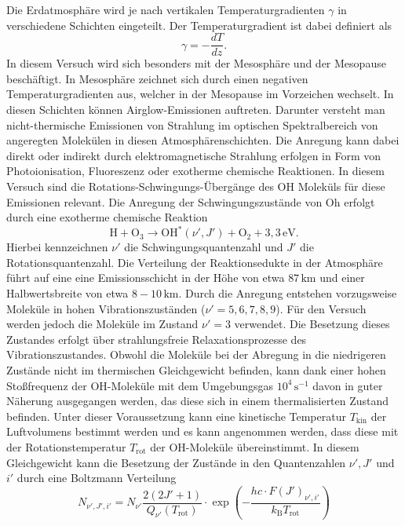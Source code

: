 \documentclass[numbers=noenddot,a4paper,notitlepage,twoside,BCOR15mm]{scrartcl}
\begin{document}
	Die Erdatmosphäre wird je nach vertikalen Temperaturgradienten $\gamma$ in verschiedene Schichten eingeteilt. Der Temperaturgradient ist dabei definiert als
	\begin{equation}
		\gamma = -\frac{dT}{dz}.
	\end{equation}
	In diesem Versuch wird sich besonders mit der Mesosphäre und der Mesopause beschäftigt. In Mesosphäre zeichnet sich durch einen negativen Temperaturgradienten aus, welcher in der Mesopause im Vorzeichen wechselt. In diesen Schichten können Airglow-Emissionen auftreten. Darunter versteht man nicht-thermische Emissionen von Strahlung im optischen Spektralbereich von angeregten Molekülen in diesen Atmosphärenschichten. Die Anregung kann dabei direkt oder indirekt durch elektromagnetische Strahlung erfolgen in Form von Photoionisation, Fluoreszenz oder exotherme chemische Reaktionen. In diesem Versuch sind die Rotations-Schwingungs-Übergänge des OH Moleküls für diese Emissionen relevant. Die Anregung der Schwingungszustände von Oh erfolgt durch eine exotherme chemische Reaktion
	\begin{equation}
		\mathrm{H} + \mathrm{O}_3 \rightarrow \mathrm{OH}^*(\nu',J') +\mathrm{O}_2 + 3,3\,\mathrm{eV}.
	\end{equation}
	Hierbei kennzeichnen $\nu'$ die Schwingungsquantenzahl und $J'$ die Rotationsquantenzahl. Die Verteilung der Reaktionsedukte in der Atmosphäre führt auf eine eine Emissionsschicht in der Höhe von etwa $87\,\mathrm{km}$ und einer Halbwertsbreite von etwa $8 - 10\,\mathrm{km}$. Durch die Anregung entstehen vorzugsweise Moleküle in hohen Vibrationszuständen ($\nu' = 5, 6, 7, 8, 9$). Für den Versuch werden jedoch die Moleküle im Zustand $\nu' = 3$ verwendet. Die Besetzung dieses Zustandes erfolgt über strahlungsfreie Relaxationsprozesse des Vibrationszustandes. Obwohl die Moleküle bei der Abregung in die niedrigeren Zustände nicht im thermischen Gleichgewicht befinden, kann dank einer hohen Stoßfrequenz der $\mathrm{OH}$-Moleküle mit dem Umgebungsgas $10^4\,\mathrm{s}^{-1}$ davon in guter Näherung ausgegangen werden, das diese sich in einem thermalisierten Zustand befinden. Unter dieser Voraussetzung kann eine kinetische Temperatur $T_\mathrm{kin}$ der Luftvolumens bestimmt werden und es kann angenommen werden, dass diese mit der Rotationstemperatur $T_\mathrm{rot}$ der OH-Moleküle übereinstimmt. In diesem Gleichgewicht kann die Besetzung der Zustände in den Quantenzahlen $\nu',J'$ und $i'$ durch eine Boltzmann Verteilung
	\begin{equation}
	\label{eq:boltzmann}
		N_{\nu', J', i'} = N_{\nu'}\frac{2(2J'+1)}{Q_{\nu'}(T_\mathrm{rot})}\cdot \exp \left(-\frac{hc\cdot F(J')_{\nu', i'}}{k_\mathrm{B}T_\mathrm{rot}}\right)
	\end{equation}
\end{document}
